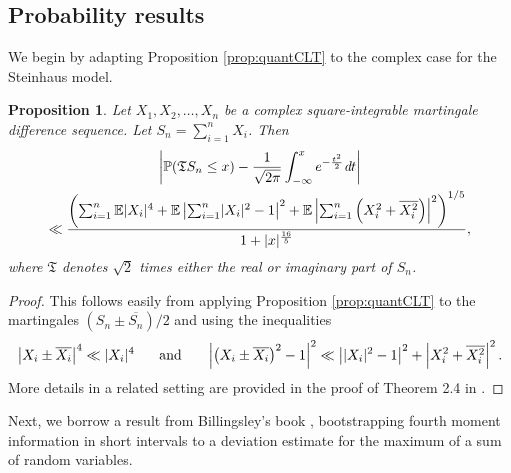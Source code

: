 \documentclass[11pt]{tran-l}
\newtheorem{prop}[theorem]{Proposition}
\theoremstyle{definition}
\theoremstyle{remark}
\numberwithin{equation}{section}
\begin{document}
\subsection{Probability results} We begin by adapting Proposition \ref{prop:quantCLT} to the complex case for the Steinhaus model. 

\begin{prop}\label{prop:quantCLT-complex}
    Let $X_1, X_2, \ldots, X_n$ be a complex square-integrable martingale difference sequence. 
    Let $S_n = \sum_{i=1}^n X_i$. Then 
    \begin{multline*}
\left\lvert\mathbb P(\mathfrak TS_n\leq x) - \frac{1}{\sqrt{2\pi}}\int_{-\infty}^xe^{-\frac{t^2}{2}}\emph{d}t\right\rvert \\ \ll \frac{\left(\sum_{i=1}^n \mathbb E\lvert X_i\rvert^4 + \mathbb E\left\lvert\sum_{i=1}^n \lvert X_i\rvert ^2 - 1\right\rvert^2 + \mathbb E\left\lvert\sum_{i=1}^n \left(X_i^2 +\overline{X_i^2}\right)\right\rvert^2\right)^{1/5}}{1+\lvert x\rvert^{\frac{16}{5}}},
    \end{multline*} 
    where $\mathfrak T$ denotes $\sqrt2$ times either the real or imaginary part of $S_n$. 
\end{prop}

\begin{proof}
    This follows easily from applying Proposition \ref{prop:quantCLT} to the martingales $(S_n \pm \overline{S_n})/2$ and using the inequalities
    \begin{equation*}
        \left\lvert X_i \pm \overline{X_i}\right\rvert^4 \ll \lvert X_i\rvert^4 \hspace{0.5cm}\text{ and }\hspace{0.5cm} \left\lvert \left(X_i \pm \overline{X_i}\right)^2 - 1 \right\rvert^2 \ll \left\lvert \lvert X_i\rvert^2 - 1\right\rvert^2 + \left\lvert X_i^2  + \overline{X_i^2} \right\rvert^2.
    \end{equation*}
More details in a related setting are provided in the proof of Theorem 2.4 in \cite{soundararajan2023clt}. 
\end{proof}

Next, we borrow a result from Billingsley's book \cite{Billingsley1999Convergence}, bootstrapping fourth moment information in short intervals to a deviation estimate for the maximum of a sum of random variables. 
\end{document}
